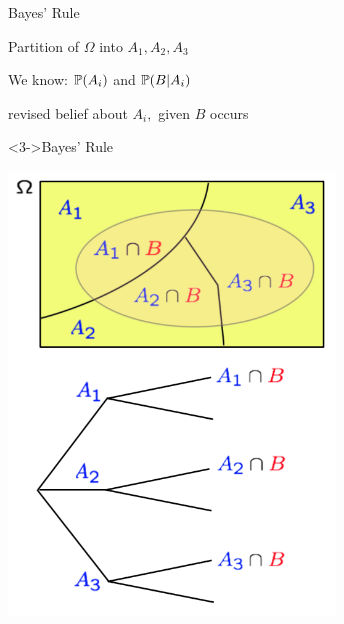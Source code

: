 \documentclass[fleqn,aspectratio=169]{beamer}
\begin{document}
\begin{frame}{Bayes' Rule}

{
\plitemsep 0.1in

\bci
\item Partition of $\Omega$ into $A_1,A_2,A_3$

\item We know: $\mathbb{P}( A_i )$ and $\mathbb{P}( B | A_i )$ 

\item<2-> 

\item<2-> revised belief about $A_i,$ given $B$ occurs

\begin{block}<3->{Bayes' Rule}
\end{block}

\eci 
}
{
\centering
\includegraphics[width=0.65\textwidth]{L2_total_ex.png}
}

\end{frame}
\end{document}
